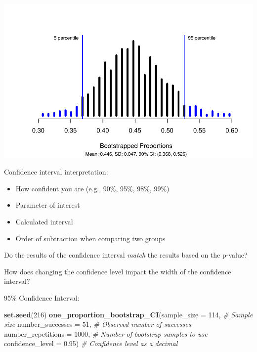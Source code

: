 \documentclass[
]{report}
\newenvironment{Shaded}{\begin{snugshade}}{\end{snugshade}}
\newcommand{\AttributeTok}[1]{\textcolor[rgb]{0.13,0.29,0.53}{#1}}
\newcommand{\CommentTok}[1]{\textcolor[rgb]{0.56,0.35,0.01}{\textit{#1}}}
\newcommand{\DecValTok}[1]{\textcolor[rgb]{0.00,0.00,0.81}{#1}}
\newcommand{\FloatTok}[1]{\textcolor[rgb]{0.00,0.00,0.81}{#1}}
\newcommand{\FunctionTok}[1]{\textcolor[rgb]{0.13,0.29,0.53}{\textbf{#1}}}
\newcommand{\NormalTok}[1]{#1}
\begin{document}
\begin{center}\includegraphics[width=0.7\linewidth]{06-LN06-1cat_simulation_files/figure-latex/unnamed-chunk-3-1} \end{center}

Confidence interval interpretation:

\begin{itemize}
\item
  How confident you are (e.g., 90\%, 95\%, 98\%, 99\%)
\item
  Parameter of interest
\item
  Calculated interval
\item
  Order of subtraction when comparing two groups
\end{itemize}

\vspace{0.8in}

Do the results of the confidence interval \emph{match} the results based on the p-value?

\vspace{0.5in}
\newpage

How does changing the confidence level impact the width of the confidence interval?

95\% Confidence Interval:

\begin{Shaded}
\begin{Highlighting}[]
\FunctionTok{set.seed}\NormalTok{(}\DecValTok{216}\NormalTok{)}
\FunctionTok{one\_proportion\_bootstrap\_CI}\NormalTok{(}\AttributeTok{sample\_size =} \DecValTok{114}\NormalTok{, }\CommentTok{\# Sample size}
                    \AttributeTok{number\_successes =} \DecValTok{51}\NormalTok{, }\CommentTok{\# Observed number of successes}
                    \AttributeTok{number\_repetitions =} \DecValTok{1000}\NormalTok{, }\CommentTok{\# Number of bootstrap samples to use}
                    \AttributeTok{confidence\_level =} \FloatTok{0.95}\NormalTok{) }\CommentTok{\# Confidence level as a decimal}
\end{Highlighting}
\end{Shaded}
\end{document}
